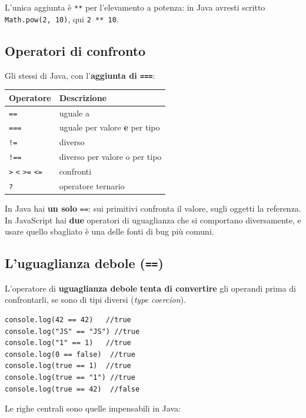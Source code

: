 \documentclass[10pt,a4paper]{article}
\begin{document}
L'unica aggiunta è \texttt{**} per l'elevamento a potenza: in Java avresti scritto \texttt{Math.pow(2, 10)}, qui \texttt{2 ** 10}.

\subsection{Operatori di confronto}

Gli stessi di Java, con l'\textbf{aggiunta di \texttt{===}}:

\begin{center}
\small
\begin{tabularx}{\textwidth}{@{}lX@{}}
\toprule
\textbf{Operatore} & \textbf{Descrizione} \\
\midrule
\texttt{==} & uguale a \\
\texttt{===} & uguale per valore \textbf{e} per tipo \\
\texttt{!=} & diverso \\
\texttt{!==} & diverso per valore o per tipo \\
\texttt{>} \texttt{<} \texttt{>=} \texttt{<=} & confronti \\
\texttt{?} & operatore ternario \\
\bottomrule
\end{tabularx}
\end{center}

In Java hai \textbf{un solo} \texttt{==}: sui primitivi confronta il valore, sugli oggetti la referenza. In JavaScript hai \textbf{due} operatori di uguaglianza che si comportano diversamente, e usare quello sbagliato è una delle fonti di bug più comuni.

\subsection{L'uguaglianza debole (\texttt{==})}

L'operatore di \textbf{uguaglianza debole} \textbf{tenta di convertire} gli operandi prima di confrontarli, se sono di tipi diversi (\emph{type coercion}).

\begin{lstlisting}[style=js]
console.log(42 == 42)   //true
console.log("JS" == "JS") //true
console.log("1" == 1)   //true
console.log(0 == false)  //true
console.log(true == 1)  //true
console.log(true == "1") //true
console.log(true == 42)  //false
\end{lstlisting}

Le righe centrali sono quelle impensabili in Java:
\end{document}
